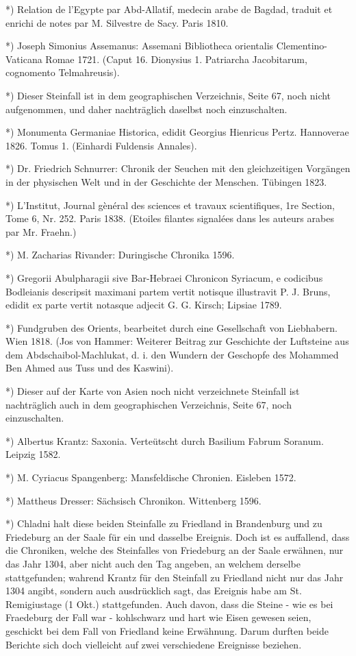 \documentclass[a4paper, 11pt, oneside, polutonikogreek, german]{article}
\begin{document}
*) Relation de l'Egypte par Abd-Allatif, medecin arabe de Bagdad, traduit et enrichi de notes par M. Silvestre de Sacy. Paris 1810.

*) Joseph Simonius Assemanus: Assemani Bibliotheca orientalis Clementino-Vaticana Romae 1721. (Caput 16. Dionysius 1. Patriarcha Jacobitarum, cognomento Telmahreusis).

*) Dieser Steinfall ist in dem geographischen Verzeichnis, Seite 67, noch nicht aufgenommen, und daher nachträglich daselbst noch einzuschalten.

*) Monumenta Germaniae Historica, edidit Georgius Hienricus Pertz. Hannoverae 1826. Tomus 1. (Einhardi Fuldensis Annales).

*) Dr. Friedrich Schnurrer: Chronik der Seuchen mit den gleichzeitigen Vorgängen in der physischen Welt und in der Geschichte der Menschen. Tübingen 1823.

*) L'Institut, Journal gènéral des sciences et travaux scientifiques, 1re Section, Tome 6, Nr. 252. Paris 1838. (Etoiles filantes signalées dans les auteurs arabes par Mr. Fraehn.)

*) M. Zacharias Rivander: Duringische Chronika 1596.

*) Gregorii Abulpharagii sive Bar-Hebraei Chronicon Syriacum, e codicibus Bodleianis descripsit maximani partem vertit notisque illustravit P. J. Bruns, edidit ex parte vertit notasque adjecit G. G. Kirsch; Lipsiae 1789.

*) Fundgruben des Orients, bearbeitet durch eine Gesellschaft von Liebhabern. Wien 1818. (Jos von Hammer: Weiterer Beitrag zur Geschichte der Luftsteine aus dem Abdschaibol-Machlukat, d. i. den Wundern der Geschopfe des Mohammed Ben Ahmed aus Tuss und des Kaswini).

*) Dieser auf der Karte von Asien noch nicht verzeichnete Steinfall ist nachträglich auch in dem geographischen Verzeichnis, Seite 67, noch einzuschalten.

*) Albertus Krantz: Saxonia. Verteütscht durch Basilium Fabrum Soranum. Leipzig 1582.

*) M. Cyriacus Spangenberg: Mansfeldische Chronien. Eisleben 1572.

*) Mattheus Dresser: Sächsisch Chronikon. Wittenberg 1596.

*) Chladni halt diese beiden Steinfalle zu Friedland in Brandenburg und zu Friedeburg an der Saale für ein und dasselbe Ereignis. Doch ist es auffallend, dass die Chroniken, welche des Steinfalles von Friedeburg an der Saale erwähnen, nur das Jahr 1304, aber nicht auch den Tag angeben, an welchem derselbe stattgefunden; wahrend Krantz für den Steinfall zu Friedland nicht nur das Jahr 1304 angibt, sondern auch ausdrücklich sagt, das Ereignis habe am St. Remigiustage (1 Okt.) stattgefunden. Auch davon, dass die Steine - wie es bei Fraedeburg der Fall war - kohlschwarz und hart wie Eisen gewesen seien, geschickt bei dem Fall von Friedland keine Erwähnung. Darum durften beide Berichte sich doch vielleicht auf zwei verschiedene Ereignisse beziehen.
\end{document}
